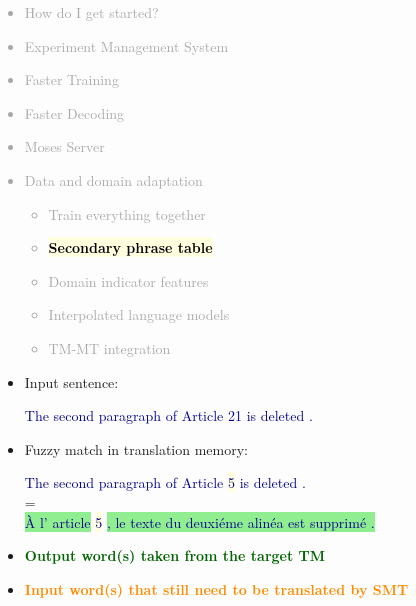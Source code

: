 \documentclass[landscape]{uedslides2C}
\newcommand{\example}[1]{\textcolor{darkblue}{\rm #1}}
\newcommand{\currenttopic}[1]{\colorbox{lightyellow}{\textcolor{black}{\bf #1}}}
\newcommand{\highlight}[1]{\colorbox{lightyellow}{#1}}
\newcommand{\highlightOrange}[1]{\colorbox{lightorange}{#1}}
\newcommand{\highlightGreen}[1]{\colorbox{lightgreen}{#1}}
\begin{document}
\vspace{-5mm}
\textcolor{darkgrey}{
\begin{itemize} \itemsep -1mm
\item {How do I get started?}
\item {Experiment Management System}
\item {Faster Training}
\item {Faster Decoding}
\item {Moses Server}
\item {Data and domain adaptation}
  \begin{itemize}\vspace{-5mm}
  \item {Train everything together}
  \item \currenttopic{Secondary phrase table}
\item Domain indicator features
\item Interpolated language models
  \item TM-MT integration
  \end{itemize}
\end{itemize}
}


\begin{itemize}
\item Input sentence: \vspace{-5mm}
\begin{center}
\example{The second paragraph of Article \highlightOrange{21} is deleted .}
\end{center}
\item Fuzzy match in translation memory: \vspace{-5mm}
\begin{center}
\example{The second paragraph of Article \highlight{5} is deleted .}\\
=\\
\example{\highlightGreen{{\`A} l' article} \highlight{5} \highlightGreen{, le texte du deuxi{\'e}me alin{\'e}a est supprim{\'e} .}}
\end{center}
\item[] \textcolor{darkgreen}{\bf Output word(s) taken from the target TM}  \vspace{-5mm}
\item[] \textcolor{darkorange}{\bf Input word(s) that still need to be translated by SMT}
\end{itemize}
\end{document}
